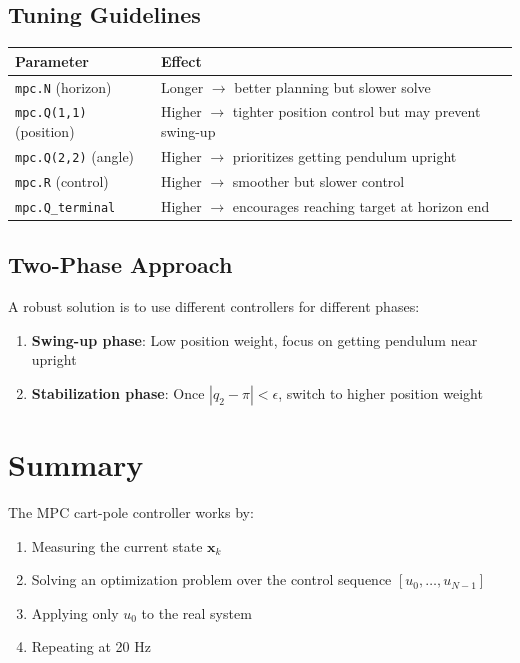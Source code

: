\documentclass[11pt]{article}
\begin{document}
\subsection{Tuning Guidelines}

\begin{tabular}{lp{8cm}}
\toprule
Parameter & Effect \\
\midrule
\texttt{mpc.N} (horizon) & Longer $\rightarrow$ better planning but slower solve \\
\texttt{mpc.Q(1,1)} (position) & Higher $\rightarrow$ tighter position control but may prevent swing-up \\
\texttt{mpc.Q(2,2)} (angle) & Higher $\rightarrow$ prioritizes getting pendulum upright \\
\texttt{mpc.R} (control) & Higher $\rightarrow$ smoother but slower control \\
\texttt{mpc.Q\_terminal} & Higher $\rightarrow$ encourages reaching target at horizon end \\
\bottomrule
\end{tabular}

\subsection{Two-Phase Approach}

A robust solution is to use different controllers for different phases:
\begin{enumerate}
    \item \textbf{Swing-up phase}: Low position weight, focus on getting pendulum near upright
    \item \textbf{Stabilization phase}: Once $|q_2 - \pi| < \epsilon$, switch to higher position weight
\end{enumerate}

\section{Summary}

The MPC cart-pole controller works by:
\begin{enumerate}
    \item Measuring the current state $\mathbf{x}_k$
    \item Solving an optimization problem over the control sequence $[u_0, \ldots, u_{N-1}]$
    \item Applying only $u_0$ to the real system
    \item Repeating at 20 Hz
\end{enumerate}
\end{document}
